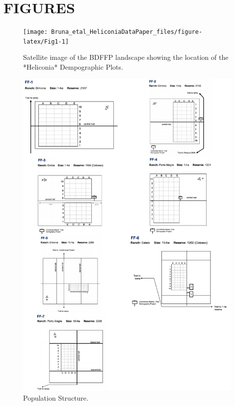 \documentclass[
  english,
  man]{apa6}
\begin{document}
\newpage

\hypertarget{figures}{%
\section{FIGURES}\label{figures}}

\begin{figure}

{\centering \texttt{[image: Bruna\_etal\_HeliconiaDataPaper\_files/figure-latex/Fig1-1]} 

}

\caption{Satellite image of the BDFFP landscape showing the location of the *Heliconia* Dempographic Plots.}\label{fig:Fig1}
\end{figure}

\begin{figure}

{\centering \includegraphics{Bruna_etal_HeliconiaDataPaper_files/figure-latex/Fig2-1} 

}

\caption{Population Structure.}\label{fig:Fig2}
\end{figure}


\clearpage
\renewcommand{\listfigurename}{Figure captions}
\end{document}

